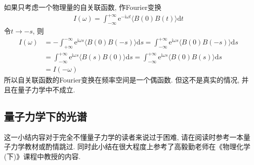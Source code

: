     如果只考虑一个物理量的自关联函数, 作Fourier变换
    \begin{equation}\begin{aligned}
    I(\omega) = \int_{-\infty}^{+\infty} \mathrm{e}^{-\mathrm{i}\omega t} \langle B(0)B(t) \rangle \mathrm{d}t
    \end{aligned}\end{equation}
    令$t \to -s$, 则
    \begin{equation}\begin{aligned}
    I(\omega) 
    &= -\int_{+\infty}^{-\infty} \mathrm{e}^{\mathrm{i}\omega s} \langle B(0)B(-s) \rangle \mathrm{d}s
    =  \int_{-\infty}^{+\infty} \mathrm{e}^{\mathrm{i}\omega s} \langle B(0)B(-s) \rangle \mathrm{d}s\\
    &= \int_{-\infty}^{+\infty} \mathrm{e}^{\mathrm{i}\omega s} \langle B(s)B(0) \rangle \mathrm{d}s
    =  \int_{-\infty}^{+\infty} \mathrm{e}^{\mathrm{i}\omega s} \langle B(0)B(s) \rangle \mathrm{d}s\\
    &= I(-\omega)
    \end{aligned}\end{equation}
    所以自关联函数的Fourier变换在频率空间是一个偶函数. 但这不是真实的情况, 并且在量子力学中不成立.

    \subsection{量子力学下的光谱}

    这一小结内容对于完全不懂量子力学的读者来说过于困难, 请在阅读时参考一本量子力学教材或酌情跳过. 同时此小结在很大程度上参考了高毅勤老师在《物理化学(下)》课程中教授的内容.

